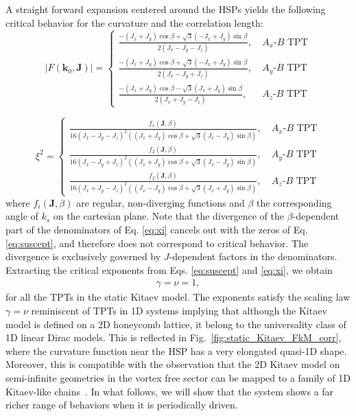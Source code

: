 \documentclass[aps,prb,twocolumn,superscriptaddress,groupedaddress]{revtex4}
\begin{document}
A straight forward expansion centered around the HSPs yields the following critical behavior for the curvature and the correlation length:
%
\begin{equation}
|F(\mathbf{k}_0, \mathbf{J})| = \begin{cases}
\frac{-(J_x+J_y) \cos \beta + \sqrt{3} (-J_x + J_y) \sin \beta}{2(J_x - J_y - J_z)}, \: &\scriptstyle{\text{$A_x$-$B$ TPT}} \\
\frac{-(J_x+J_y) \cos \beta + \sqrt{3} (-J_x + J_y) \sin \beta}{2(J_x - J_y + J_z)}, \: &\scriptstyle{\text{$A_y$-$B$ TPT}} \\
\frac{-(J_x+J_y) \cos \beta - \sqrt{3} (J_x + J_y) \sin \beta}{2(J_x + J_y - J_z)}, \: &\scriptstyle{\text{$A_z$-$B$ TPT}}
\end{cases}
\label{eq:suscept}
\end{equation}
%

%
\begin{equation}
\xi^2 = \begin{cases}
\frac{f_1(\mathbf{J}, \beta)}{16(J_x-J_y-J_z)^2 ((J_x+J_y)\cos \beta + \sqrt{3} (J_x - J_y) \sin \beta)},  \: &\scriptstyle{\text{$A_x$-$B$ TPT}} \\
\frac{f_2(\mathbf{J}, \beta)}{16(J_x-J_y+J_z)^2 ((J_x+J_y)\cos \beta + \sqrt{3} (J_x - J_y) \sin \beta)},  \: &\scriptstyle{\text{$A_y$-$B$ TPT}} \\
\frac{f_2(\mathbf{J}, \beta)}{16(J_x+J_y-J_z)^2 ((J_x-J_y)\cos \beta + \sqrt{3} (J_x + J_y) \sin \beta)},  \: &\scriptstyle{\text{$A_z$-$B$ TPT}}
\end{cases}
\label{eq:xi}
\end{equation}
%
where $f_i(\mathbf{J}, \beta)$ are regular, non-diverging functions and $\beta$ the corresponding angle of $k_s$ on the cartesian plane. 
Note that the divergence of the $\beta$-dependent part of the denominators of Eq. \eqref{eq:xi} cancels out with the zeros of Eq. \eqref{eq:suscept}, and therefore does not correspond to critical behavior.
The divergence is exclusively governed by $J$-dependent factors in the denominators.
Extracting the critical exponents from Eqs. \eqref{eq:suscept} and \eqref{eq:xi}, we obtain
%
\begin{eqnarray}
\gamma=\nu=1,
\end{eqnarray}
%
for all the TPTs in the static Kitaev model.  The exponents satisfy the scaling law $\gamma=\nu$  reminiscent of TPTs in 1D systems\cite{Chen:2017,Chen-Sigrist-book:2019,Chen-Schnyder:2019}  implying  that although the Kitaev model is defined on a 2D honeycomb lattice, it belong to the universality class of 1D linear Dirac models. 
This  is reflected  in Fig.~\ref{fig:static_Kitaev_FkM_corr}, where the curvature function near the HSP has a very elongated  quasi-1D shape. 
Moreover, this is compatible with the observation that the 2D Kitaev model on semi-infinite geometries in the vortex free sector can be mapped to a family of 1D Kitaev-like chains~\cite{Thakurathi:2014}.
In what follows, we will show that the system shows a far richer range of behaviors when it is periodically driven.
\end{document}

